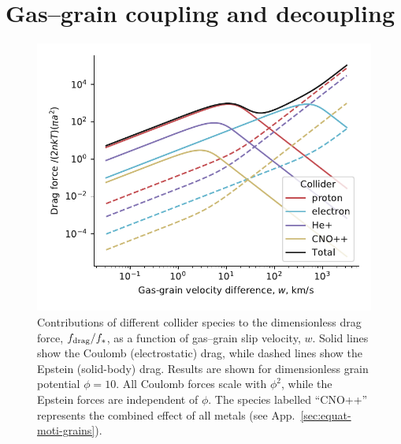 

\section{Gas--grain coupling and decoupling}
\label{sec:imperf-coupl-betw}

\begin{figure}
  \includegraphics[width=\linewidth]{figs/test-Fdrag-components}
  \caption{Contributions of different collider species to the
    dimensionless drag force, \(f_{\text{drag}} / f_*\), as a function of
    gas--grain slip velocity, \(w\).  Solid lines show the Coulomb
    (electrostatic) drag, while dashed lines show the Epstein
    (solid-body) drag.  Results are shown for dimensionless grain
    potential \(\phi = 10\).  All Coulomb forces scale with
    \(\phi^2\), while the Epstein forces are independent of \(\phi\).  The
    species labelled ``CNO++'' represents the combined effect of all
    metals (see App.~\ref{sec:equat-moti-grains}).}
  \label{fig:drag-components}
\end{figure}


